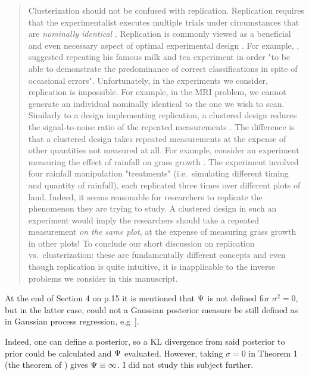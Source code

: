 \begin{quote} %
  Clusterization should not be confused with replication. Replication
requires that the experimentalist executes multiple trials under
circumstances that are \emph{nominally identical} \cite[Section
  1.2.4]{morris2011}. Replication is commonly viewed as a beneficial
and even necessary aspect of optimal experimental design
\cite{fisher1949design, morris2011, schafer2001replication}.
For example, \cite{fisher1949design}, suggested repeating his famous
milk and tea experiment in order "to be able to demonstrate the
predominance of correct classifications in spite of occasional
errors". Unfortunately, in the experiments we consider, replication is
impossible. For example, in the MRI problem, we cannot generate an
individual nominally identical to the one we wish to scan.
\newline
\newline
Similarly to a design implementing replication, a clustered design
reduces the signal-to-noise ratio of the repeated measurements
\cite{telford2007brief}. The difference is that a clustered design
takes repeated measurements at the expense of other quantities not
measured at all. For example, consider an experiment measuring the
effect of rainfall on grass growth \cite{fay2000rainfall}. The
experiment involved four rainfall manipulation "treatments"
(i.e.~simulating different timing and quantity of rainfall), each
replicated three times over different plots of land. Indeed, it seems
reasonable for researchers to replicate the phenomenon they are trying
to study. A clustered design in such an experiment would imply the
researchers should take a repeated measurement \emph{on the same
plot}, at the expense of measuring grass growth in other plots!
\newline
\newline
To conclude our short discussion on replication vs.~clusterization:
these are fundamentally different concepts and even though replication
is quite intuitive, it is inapplicable to the inverse problems we
consider in this manuscript.
\end{quote}
  
  
\RC At the end of Section 4 on p.15 it is mentioned that $\Psi$ is not
defined for $\sigma^2= 0$, but in the latter case, could not a
Gaussian posterior measure be still defined as in Gaussian process
regression, e.g~\cite{rasmussen2006}].

\AR Indeed, one can define a posterior, so a KL divergence from said
posterior to prior could be calculated and $\Psi$ evaluated. However,
taking $\sigma = 0$ in Theorem 1 (the theorem of
\cite{AlexanderianGloorGhattas14}) gives $\Psi \equiv \infty$. I did
not study this subject further.

